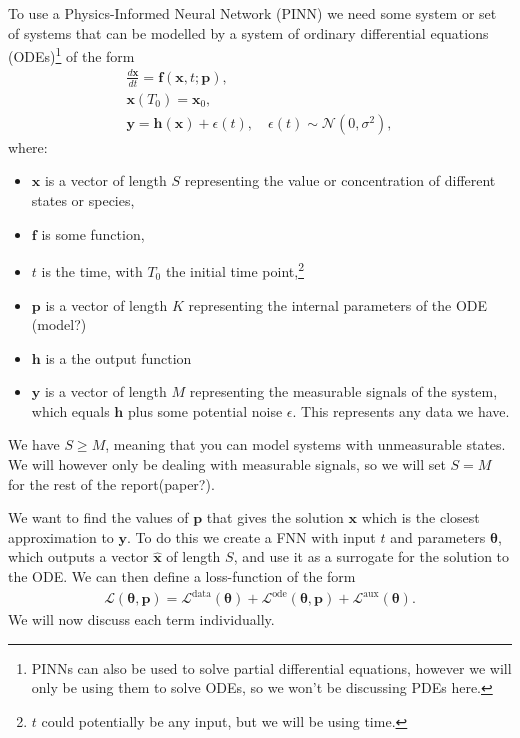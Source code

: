 To use a Physics-Informed Neural Network (PINN) we need some system or set of systems that can be modelled by a system of ordinary differential equations (ODEs)\footnote{PINNs can also be used to solve partial differential equations, however we will only be using them to solve ODEs, so we won't be discussing PDEs here.} 
of the form
\begin{subequations} \label{eq:ode}
\begin{gather}
	\frac{d \mathbf{x}}{d t}=\boldsymbol{f}(\mathbf{x}, t ; \mathbf{p}), \label{eq:ode_a} \\
	\mathbf{x}\left(T_{0}\right)=\mathbf{x}_{0}, \label{eq:ode_b} \\
	\mathbf{y}=\boldsymbol{h}(\mathbf{x})+\epsilon(t), \quad \epsilon(t) \sim \mathcal{N}\left(0, \sigma^{2}\right), \label{eq:ode_c}
\end{gather}
\end{subequations}
where:
\begin{itemize} %
	\setlength\itemsep{-.1em}
	\item $\mathbf{x}$ is a vector of length $S$ representing the value or concentration of different states or species,
	\item $\mathbf{f}$ is some function,
	\item $t$ is the time, with $T_0$ the initial time point,\footnote{$t$ could potentially be any input, but we will be using time.}
	\item $\mathbf{p}$ is a vector of length $K$ representing the internal parameters of the ODE (model?)
	\item $\mathbf{h}$ is a the output function %
	\item $\mathbf{y}$ is a vector of length $M$ representing the measurable signals of the system, which equals $\mathbf{h}$ plus some potential noise $\epsilon$. This represents any data we have. %
\end{itemize}
We have $S \geq M$, meaning that you can model systems with unmeasurable states. We will however only be dealing with measurable signals, so we will set $S=M$ for the rest of the report(paper?). %

We want to find the values of $\mathbf{p}$ that gives the solution $\mathbf{x}$ which is the closest approximation to $\mathbf{y}$. To do this we create a FNN with input $t$ and parameters $\mathbf{\theta}$, which outputs a vector $\hat{\mathbf{x}}$ %
of length $S$, and use it as a surrogate for the solution to the ODE. We can then define a loss-function of the form
\begin{align}
	\mathcal{L}(\boldsymbol{\theta}, \mathbf{p}) 
	= \mathcal{L}^{\text {data}}(\boldsymbol{\theta}) + \mathcal{L}^{\text {ode}}(\boldsymbol{\theta}, \mathbf{p}) + \mathcal{L}^{\text {aux}}(\boldsymbol{\theta}). \label{eq:losses}
\end{align}
We will now discuss each term individually. %



